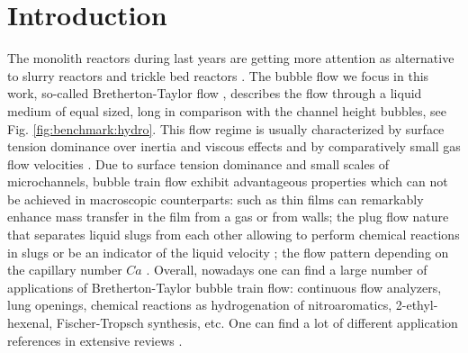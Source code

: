 \documentclass{article}
\begin{document}
\section{Introduction}
\label{intro}
The monolith reactors during last years are getting more attention as alternative to slurry
reactors and trickle bed reactors \cite{kreutzer-overview,bercic-mass}. The bubble flow we focus in
this work, so-called Bretherton-Taylor flow \cite{bretherton,taylor}, describes the flow through
a liquid medium of equal sized, long in comparison with the channel height bubbles, see
Fig. \ref{fig:benchmark:hydro}. This flow regime
is usually characterized by surface tension dominance over inertia and viscous effects and by
comparatively small gas flow velocities \cite{yue-mass}. Due to surface tension dominance and small
scales of microchannels, bubble train flow exhibit advantageous properties which can not be achieved
in macroscopic counterparts: such as thin films \cite{bretherton} can remarkably enhance mass
transfer in the film from a gas or from walls; the plug flow nature that separates liquid slugs from each
other allowing to perform chemical reactions in slugs \cite{kreutzer-overview} or be an indicator of
the liquid velocity \cite{taylor}; the flow pattern depending on the capillary number $Ca$
\cite{heil-bretherton,heil-threedim}.  Overall, nowadays one can find a large number of applications
of Bretherton-Taylor bubble train flow: continuous flow analyzers, lung openings, chemical reactions
as hydrogenation of nitroaromatics, 2-ethyl-hexenal, Fischer-Tropsch synthesis, etc. One can find a
lot of different application references in extensive reviews \cite{kreutzer-overview,
gupta-review,yue-mass}. 
\end{document}
